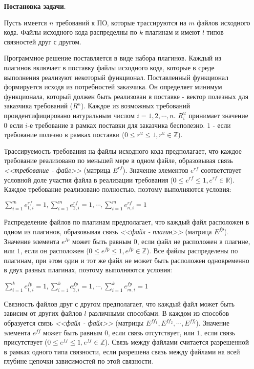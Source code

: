 \documentclass{article}
\begin{document}
  \textbf{Постановка задачи}.

  Пусть имеется $n$ требований к ПО, которые трассируются на $m$ файлов исходного кода. Файлы исходного кода распределны по $k$ плагинам и имеют $l$ типов связностей друг с другом.

  Программное решение поставляется в виде набора плагинов. Каждый из плагинов включает в поставку файлы исходного кода, которые в среде выполнения реализуют некоторый функционал. Поставленный функционал формируется исходя из потребностей заказчика. Он определяет минимум функционала, который должен быть реализован в поставке - вектор полезных для заказчика требований ($R^{u}$). Каждое из возможных требований проидентифицировано натуральным числом $i = 1, 2, \cdots, n$. $R^{u}_{i}$ принимает значение $0$ если $i$-е требование в рамках поставки для заказчика бесполезно. $1$ - если требование полезно в рамках поставки ($0 \le r^{u} \le 1, r^{u} \in \mathbb{Z}$).

  Трассируемость требования на файлы исходного кода предполагает, что каждое требование реализовано по меньшей мере в одном файле, образовывая связь \textit{<<требование - файл>>} (матрица $E^{rf}$). Значение элементов $e^{rf}$ соответствует условной доле участия файла в реализации требования ($0 \le e^{rf} \le 1, e^{rf} \in \mathbb{R}$). Каждое требование реализовано полностью, поэтому выполняются условия:
  \begin{center}
    $\displaystyle\sum^{m}_{i = 1} e^{rf}_{1, i} = 1, \displaystyle\sum^{m}_{i = 1} e^{rf}_{2, i} = 1, \cdots, \displaystyle\sum^{m}_{i = 1} e^{rf}_{n, i} = 1$
  \end{center}

  Распределение файлов по плагинам предполагает, что каждый файл расположен в одном из плагинов, образовывая связь \textit{<<файл - плагин>>} (матрица $E^{fp}$). Значение элемента $e^{fp}$ может быть равным $0$, если файл не расположен в плагине, или $1$, если он расположен ($0 \le e^{fp} \le 1, e^{fp} \in \mathbb{Z}$). Все файлы распределены по плагинам, при этом один и тот же файл не может быть расположен одновременно в двух разных плагинах, поэтому выполняются условия:
  \begin{center}
    $\displaystyle\sum^{k}_{i = 1} e^{fp}_{1, i} = 1, \displaystyle\sum^{k}_{i = 1} e^{fp}_{2, i} = 1, \cdots, \displaystyle\sum^{k}_{i = 1} e^{fp}_{m, i} = 1$
  \end{center}

  Связность файлов друг с другом предполагает, что каждый файл может быть зависим от других файлов $l$ различными способами. В каждом из способов образуется связь \textit{<<файл - файл>>} (матрицы $E^{ff_{1}}, E^{ff_{2}}, \cdots, E^{ff_{l}}$). Значение элемента $e^{ff}$ может быть равным $0$, если связь отсутствует, или $1$, если связь присутствует ($0 \le e^{ff} \le 1, e^{ff} \in \mathbb{Z}$). Связь между файлами считается разрешенной в рамках одного типа связности, если разрешена связь между файлами на всей глубине цепочки зависимостей по этой связности.
\end{document}
